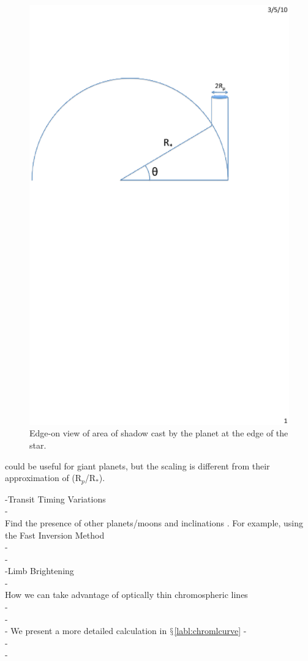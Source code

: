 \documentclass[manuscript]{aastex}
\begin{document}
\begin{figure}
\includegraphics[trim = 1in 6in 2in 0.5in,clip,width=3 in]{Chromospheric_shadow.eps}
\caption{Edge-on view of area of shadow cast by the planet
at the edge of the star.}
\label{fig01}
\end{figure}


 could be useful for
giant planets, but the scaling is different from their approximation
of (R$_p$/R$_*$).

-Transit Timing Variations \\
-\\
    Find the presence of other planets/moons and inclinations \citep{2005MNRAS.359..567A}. For example, using the Fast Inversion Method \citep{2010ApJ...709L..44N}\\
-\\
-\\    
-Limb Brightening \\
-\\
    How we can take advantage of optically thin chromospheric lines \\
-\\
-\\
    - We present a more detailed calculation in $\mathsection$\ref{labl:chromlcurve}
-\\
-\\
-\\
\end{document}
